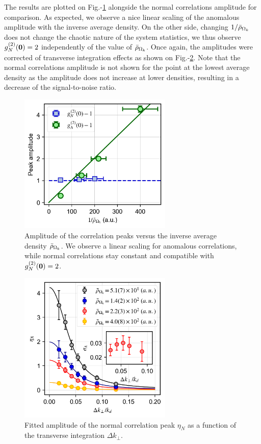 The results are plotted on Fig.-\ref{fig:amplitude_vs_rhob} alongside the normal correlations amplitude for comparison. As expected, we observe a nice linear scaling of the anomalous amplitude with the inverse average density. On the other side, changing $1/\bar{\rho}_{\Omega_k}$ does not change the chaotic nature of the system statistics, we thus observe $g^{(2)}_N (\bm{0})=2$ independently of the value of $\bar{\rho}_{\Omega_k}$. Once again, the amplitudes were corrected of transverse integration effects as shown on Fig.-\ref{fig:eta_vs_int_kmk}. Note that the normal correlations amplitude is not shown for the point at the lowest average density as the amplitude does not increase at lower densities, resulting in a decrease of the signal-to-noise ratio.

\begin{figure}
    \centering
    \includegraphics[width=0.65\textwidth]{Fig/Chapter4/amplitude_kmk.png}
    \caption{Amplitude of the correlation peaks versus the inverse average density $\bar{\rho}_{\Omega_k}$. We observe a linear scaling for anomalous correlations, while normal correlations stay constant and compatible with $g^{(2)}_N (\bm{0})=2$.}
    \label{fig:amplitude_vs_rhob}
\end{figure}

\begin{figure}
    \centering
    \includegraphics[width=0.65\textwidth]{Fig/Chapter4/eta_vs_int_kmk.png}
    \caption{Fitted amplitude of the normal correlation peak $\eta_N$ as a function of the transverse integration $\Delta k_{\perp}$.}
    \label{fig:eta_vs_int_kmk}
\end{figure}

